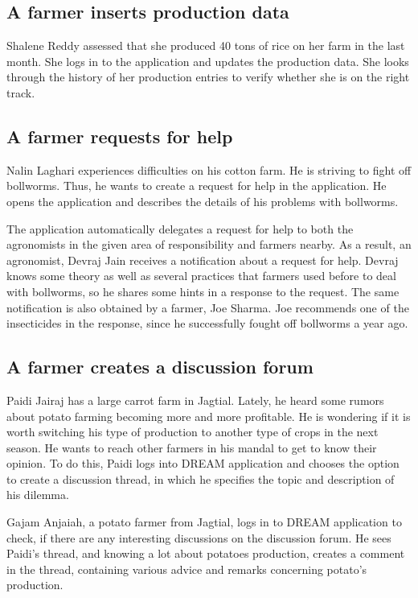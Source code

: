 \subsection*{A farmer inserts production data}
Shalene Reddy assessed that she produced 40 tons of rice on her farm in the last month. She logs in to the application and updates the production data. She looks through the history of her production entries to verify whether she is on the right track. 

\subsection*{A farmer requests for help}
Nalin Laghari experiences difficulties on his cotton farm. He is striving to fight off bollworms. Thus, he wants to create a request for help in the application. He opens the application and describes the details of his problems with bollworms.

The application automatically delegates a request for help to both the agronomists in the given area of responsibility and farmers nearby. As a result, an agronomist, Devraj Jain receives a notification about a request for help. Devraj knows some theory as well as several practices that farmers used before to deal with bollworms, so he shares some hints in a response to the request. The same notification is also obtained by a farmer, Joe Sharma. Joe recommends one of the insecticides in the response, since he successfully fought off bollworms a year ago.

\subsection*{A farmer creates a discussion forum}
Paidi Jairaj has a large carrot farm in Jagtial. Lately, he heard some rumors about potato farming becoming more and more profitable. He is wondering if it is worth switching his type of production to another type of crops in the next season. He wants to reach other farmers in his mandal to get to know their opinion. To do this, Paidi logs into DREAM application and chooses the option to create a discussion thread, in which he specifies the topic and description of his dilemma.

Gajam Anjaiah, a potato farmer from Jagtial, logs in to DREAM application to check, if there are any interesting discussions on the discussion forum. He sees Paidi's thread, and knowing a lot about potatoes production, creates a comment in the thread, containing various advice and remarks concerning potato's production.


